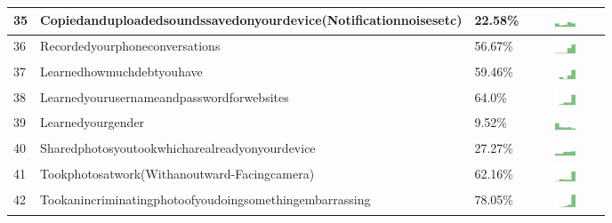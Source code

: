 \begin{table}[t]
\begin{center}
\begin{tabular}{| p{0.5cm} | p{7cm} | p{1cm} | c |}
35 & Copiedanduploadedsoundssavedonyourdevice(Notificationnoisesetc) & 22.58\% & \includegraphics[width = 2cm, height = 0.5cm]{../copiedanduploadedsoundssavedonyourdevice(notificationnoisesetc)APPSERVER} \\ \hline 
36 & Recordedyourphoneconversations & 56.67\% & \includegraphics[width = 2cm, height = 0.5cm]{../recordedyourphoneconversationsAPPSERVER} \\ \hline 
37 & Learnedhowmuchdebtyouhave & 59.46\% & \includegraphics[width = 2cm, height = 0.5cm]{../learnedhowmuchdebtyouhaveAPPSERVER} \\ \hline 
38 & Learnedyourusernameandpasswordforwebsites & 64.0\% & \includegraphics[width = 2cm, height = 0.5cm]{../learnedyourusernameandpasswordforwebsitesAPPSERVER} \\ \hline 
39 & Learnedyourgender & 9.52\% & \includegraphics[width = 2cm, height = 0.5cm]{../learnedyourgenderAPPSERVER} \\ \hline 
40 & Sharedphotosyoutookwhicharealreadyonyourdevice & 27.27\% & \includegraphics[width = 2cm, height = 0.5cm]{../sharedphotosyoutookwhicharealreadyonyourdeviceAPPSERVER} \\ \hline 
41 & Tookphotosatwork(Withanoutward-Facingcamera) & 62.16\% & \includegraphics[width = 2cm, height = 0.5cm]{../tookphotosatwork(withanoutward-facingcamera)APPSERVER} \\ \hline 
42 & Tookanincriminatingphotoofyoudoingsomethingembarrassing & 78.05\% & \includegraphics[width = 2cm, height = 0.5cm]{../tookanincriminatingphotoofyoudoingsomethingembarrassingAPPSERVER} \\ \hline 

\end{tabular}
\end{center}
\end{table}
